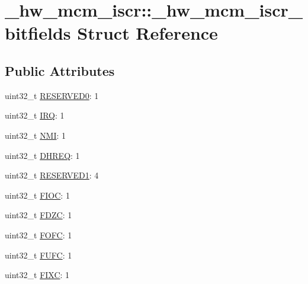 \hypertarget{struct__hw__mcm__iscr_1_1__hw__mcm__iscr__bitfields}{}\section{\+\_\+hw\+\_\+mcm\+\_\+iscr\+:\+:\+\_\+hw\+\_\+mcm\+\_\+iscr\+\_\+bitfields Struct Reference}
\label{struct__hw__mcm__iscr_1_1__hw__mcm__iscr__bitfields}
\subsection*{Public Attributes}
\begin{DoxyCompactItemize}
\item 
uint32\+\_\+t \hyperlink{struct__hw__mcm__iscr_1_1__hw__mcm__iscr__bitfields_a1ce54f36c75acc4864edd3378f68abfa}{R\+E\+S\+E\+R\+V\+E\+D0}\+: 1
\item 
uint32\+\_\+t \hyperlink{struct__hw__mcm__iscr_1_1__hw__mcm__iscr__bitfields_a013be3db2faad0ef07dc26f575d51798}{I\+RQ}\+: 1
\item 
uint32\+\_\+t \hyperlink{struct__hw__mcm__iscr_1_1__hw__mcm__iscr__bitfields_a963e59e121fb87d67dda46ac3330a89b}{N\+MI}\+: 1
\item 
uint32\+\_\+t \hyperlink{struct__hw__mcm__iscr_1_1__hw__mcm__iscr__bitfields_a0ea028b9721dd4d9d33a71fb66244ba4}{D\+H\+R\+EQ}\+: 1
\item 
uint32\+\_\+t \hyperlink{struct__hw__mcm__iscr_1_1__hw__mcm__iscr__bitfields_aa8a2a7de8087ff642bd648c300c678de}{R\+E\+S\+E\+R\+V\+E\+D1}\+: 4
\item 
uint32\+\_\+t \hyperlink{struct__hw__mcm__iscr_1_1__hw__mcm__iscr__bitfields_ac18aa6e16c229b1ec5f13de17e185415}{F\+I\+OC}\+: 1
\item 
uint32\+\_\+t \hyperlink{struct__hw__mcm__iscr_1_1__hw__mcm__iscr__bitfields_a736f6bfd3cdd5632c124a2144c721e7b}{F\+D\+ZC}\+: 1
\item 
uint32\+\_\+t \hyperlink{struct__hw__mcm__iscr_1_1__hw__mcm__iscr__bitfields_aa4b2ad1c17bc0aab8a044f6d65d92385}{F\+O\+FC}\+: 1
\item 
uint32\+\_\+t \hyperlink{struct__hw__mcm__iscr_1_1__hw__mcm__iscr__bitfields_acf8beda4c358d51f4b25cd38c7e287d5}{F\+U\+FC}\+: 1
\item 
uint32\+\_\+t \hyperlink{struct__hw__mcm__iscr_1_1__hw__mcm__iscr__bitfields_a07957eb840d1caccd8420fde87226244}{F\+I\+XC}\+: 1
\item 

\end{DoxyCompactItemize}
